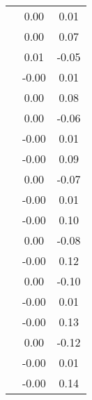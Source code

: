 \begin{table}
\begin{tabular}{c|cc|}
\multicolumn{1}{|c|}{} & \multicolumn{1}{|c|}{      0.00} & \multicolumn{1}{|c|}{      0.01} \\ 
\multicolumn{1}{|c|}{} & \multicolumn{1}{|c|}{      0.00} & \multicolumn{1}{|c|}{      0.07} \\ 
\multicolumn{1}{|c|}{} & \multicolumn{1}{|c|}{      0.01} & \multicolumn{1}{|c|}{     -0.05} \\ 
\multicolumn{1}{|c|}{} & \multicolumn{1}{|c|}{     -0.00} & \multicolumn{1}{|c|}{      0.01} \\ 
\multicolumn{1}{|c|}{} & \multicolumn{1}{|c|}{      0.00} & \multicolumn{1}{|c|}{      0.08} \\ 
\multicolumn{1}{|c|}{} & \multicolumn{1}{|c|}{      0.00} & \multicolumn{1}{|c|}{     -0.06} \\ 
\multicolumn{1}{|c|}{} & \multicolumn{1}{|c|}{     -0.00} & \multicolumn{1}{|c|}{      0.01} \\ 
\multicolumn{1}{|c|}{} & \multicolumn{1}{|c|}{     -0.00} & \multicolumn{1}{|c|}{      0.09} \\ 
\multicolumn{1}{|c|}{} & \multicolumn{1}{|c|}{      0.00} & \multicolumn{1}{|c|}{     -0.07} \\ 
\multicolumn{1}{|c|}{} & \multicolumn{1}{|c|}{     -0.00} & \multicolumn{1}{|c|}{      0.01} \\ 
\multicolumn{1}{|c|}{} & \multicolumn{1}{|c|}{     -0.00} & \multicolumn{1}{|c|}{      0.10} \\ 
\multicolumn{1}{|c|}{} & \multicolumn{1}{|c|}{      0.00} & \multicolumn{1}{|c|}{     -0.08} \\ 
\multicolumn{1}{|c|}{} & \multicolumn{1}{|c|}{     -0.00} & \multicolumn{1}{|c|}{      0.12} \\ 
\multicolumn{1}{|c|}{} & \multicolumn{1}{|c|}{      0.00} & \multicolumn{1}{|c|}{     -0.10} \\ 
\multicolumn{1}{|c|}{} & \multicolumn{1}{|c|}{     -0.00} & \multicolumn{1}{|c|}{      0.01} \\ 
\multicolumn{1}{|c|}{} & \multicolumn{1}{|c|}{     -0.00} & \multicolumn{1}{|c|}{      0.13} \\ 
\multicolumn{1}{|c|}{} & \multicolumn{1}{|c|}{      0.00} & \multicolumn{1}{|c|}{     -0.12} \\ 
\multicolumn{1}{|c|}{} & \multicolumn{1}{|c|}{     -0.00} & \multicolumn{1}{|c|}{      0.01} \\ 
\multicolumn{1}{|c|}{} & \multicolumn{1}{|c|}{     -0.00} & \multicolumn{1}{|c|}{      0.14} \\ 

\end{tabular}
\end{table}
